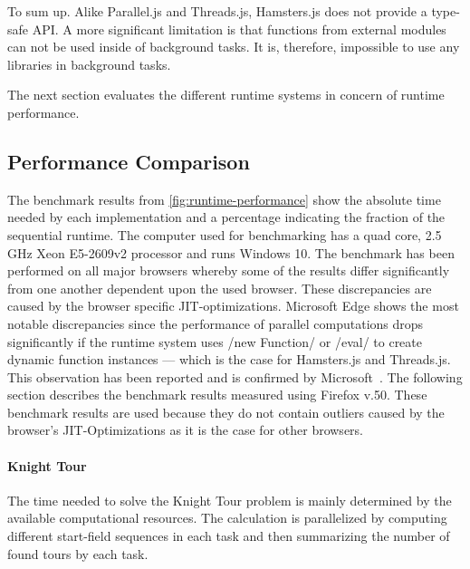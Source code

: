 To sum up. Alike Parallel.js and Threads.js, Hamsters.js does not provide a type-safe API. A more significant limitation is that functions from external modules can not be used inside of background tasks. It is, therefore, impossible to use any libraries in background tasks. 

The next section evaluates the different runtime systems in concern of runtime performance. 

\subsection{Performance Comparison}
The benchmark results from \cref{fig:runtime-performance} show the absolute time needed by each implementation and a percentage indicating the fraction of the sequential runtime. The computer used for benchmarking has a quad core, 2.5 GHz Xeon E5-2609v2 processor and runs Windows 10. The benchmark has been performed on all major browsers whereby some of the results differ significantly from one another dependent upon the used browser. These discrepancies are caused by the browser specific JIT-optimizations. Microsoft Edge shows the most notable discrepancies since the performance of parallel computations drops significantly if the runtime system uses \javascriptinline/new Function/ or \javascriptinline/eval/ to create dynamic function instances --- which is the case for Hamsters.js and Threads.js. This observation has been reported and is confirmed by Microsoft~\cite{newFunctionWebWorkerEdge}. The following section describes the benchmark results measured using Firefox v.50. These benchmark results are used because they do not contain outliers caused by the browser's JIT-Optimizations as it is the case for other browsers.

\begin{figure*}
		
	\caption{Runtimes of Parallelized Implementations Relative to Sequential Execution}
	\label{fig:runtime-performance}
\end{figure*}


\paragraph{Knight Tour} The time needed to solve the Knight Tour problem is mainly determined by the available computational resources. The calculation is parallelized by computing different start-field sequences in each task and then summarizing the number of found tours by each task. 

